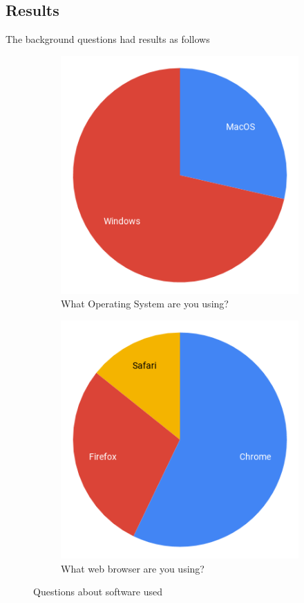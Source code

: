 \documentclass[ %
                    author={Aleena Baig},
                supervisor={Dr Simon Lock},
                    degree={BSc},
                     title={On Making Web Accessible Graphs},
                  subtitle={},
                      year={2019} ]{dissertation}
\begin{document}
\subsection{Results}

The background questions had results as follows

\begin{figure}[h]
  \centering
  \begin{subfigure}[b]{0.4\linewidth}
    \centering
    \includegraphics[width=0.75\linewidth]{images/OperatingSystem.png}
     \caption{What Operating System are you using?}
  \end{subfigure}
  \begin{subfigure}[b]{0.4\linewidth}
    \centering
    \includegraphics[width=0.75\linewidth]{images/WebBrowser.png}
    \caption{What web browser are you using?}
  \end{subfigure}
  \caption{Questions about software used}
  \label{Awkwardsaxis}
\end{figure}
\end{document}
